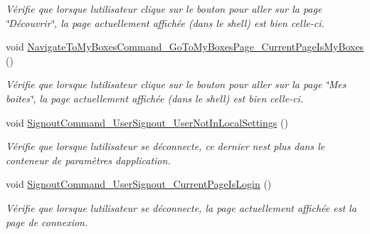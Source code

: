 \begin{DoxyCompactItemize}
\begin{DoxyCompactList}\small\item\em Vérifie que lorsque l\textquotesingle{}utilisateur clique sur le bouton pour aller sur la page \char`\"{}\+Découvrir\char`\"{}, la page actuellement affichée (dans le shell) est bien celle-\/ci. \end{DoxyCompactList}\item 
void \hyperlink{class_boxes_1_1_tests_1_1_shell_view_model_tests_a69ae404dec735ee3cc8173beec9402ac}{Navigate\+To\+My\+Boxes\+Command\+\_\+\+Go\+To\+My\+Boxes\+Page\+\_\+\+Current\+Page\+Is\+My\+Boxes} ()
\begin{DoxyCompactList}\small\item\em Vérifie que lorsque l\textquotesingle{}utilisateur clique sur le bouton pour aller sur la page \char`\"{}\+Mes boites\char`\"{}, la page actuellement affichée (dans le shell) est bien celle-\/ci. \end{DoxyCompactList}\item 
void \hyperlink{class_boxes_1_1_tests_1_1_shell_view_model_tests_a295ae7768ea8d81a65f65c08e1f7f6f9}{Signout\+Command\+\_\+\+User\+Signout\+\_\+\+User\+Not\+In\+Local\+Settings} ()
\begin{DoxyCompactList}\small\item\em Vérifie que lorsque l\textquotesingle{}utilisateur se déconnecte, ce dernier n\textquotesingle{}est plus dans le conteneur de paramètres d\textquotesingle{}application. \end{DoxyCompactList}\item 
void \hyperlink{class_boxes_1_1_tests_1_1_shell_view_model_tests_a507ede74db925d1da3eda9cbc77582cc}{Signout\+Command\+\_\+\+User\+Signout\+\_\+\+Current\+Page\+Is\+Login} ()
\begin{DoxyCompactList}\small\item\em Vérifie que lorsque l\textquotesingle{}utilisateur se déconnecte, la page actuellement affichée est la page de connexion. \end{DoxyCompactList}\end{DoxyCompactItemize}
